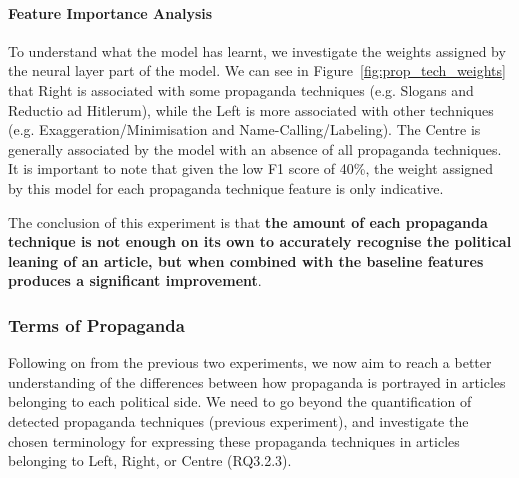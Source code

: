 \paragraph{Feature Importance Analysis}

To understand what the model has learnt, we investigate the weights assigned by the neural layer part of the model. We can see in Figure~\ref{fig:prop_tech_weights} that Right is associated with some propaganda techniques (e.g. Slogans and Reductio ad Hitlerum), while the Left is more associated with other techniques (e.g. Exaggeration/Minimisation and Name-Calling/Labeling).
The Centre is generally associated by the model with an absence of all  propaganda techniques. It is important to note that given the low F1 score of 40\%, the weight assigned by this model for each propaganda technique feature is only indicative. %




The conclusion of this experiment is that \textbf{the amount of each propaganda technique is not enough on its own to accurately recognise the political leaning of an article, but when combined with the baseline features produces a significant improvement}.


\subsubsection{Terms of Propaganda}

Following on from the previous two experiments, we now aim to reach a better understanding of the differences between how propaganda is portrayed in articles belonging to each political side.
We need to go beyond the quantification of detected propaganda techniques (previous experiment), and investigate the chosen terminology for expressing these propaganda techniques in articles belonging to Left, Right, or Centre (RQ3.2.3). %

